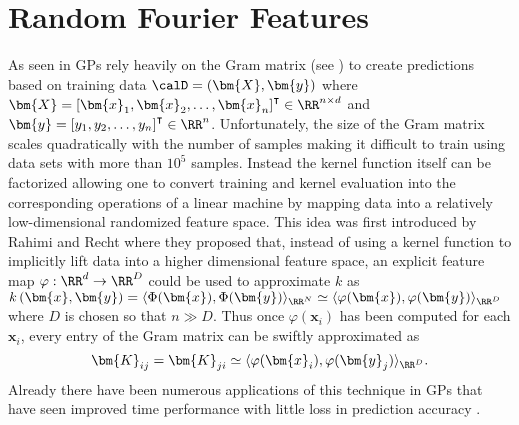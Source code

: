 \section{Random Fourier Features}\label{Chapter3}
As seen in  GPs rely heavily on the Gram matrix (see ) to create predictions based on training data $\calD = \left( \bm{X} , \bm{y} \right)$ where $\bm{X} = \left[ \bm{x}_1 , \bm{x}_2 , \ldots , \bm{x}_n \right]^{\intercal} \in \RR^{n \times d}$ and $\bm{y} = \left[ y_1 , y_2 , \ldots , y_n \right]^{\intercal} \in \RR^{n}$. Unfortunately, the size of the Gram matrix scales quadratically with the number of samples making it difficult to train using data sets with more than $10^5$ samples. Instead the kernel function itself can be factorized allowing one to convert training and kernel evaluation into the corresponding operations of a linear machine by mapping data into a relatively low-dimensional randomized feature space. This idea was first introduced by Rahimi and Recht \cite{NIPS2007_013a006f} where they proposed that, instead of using a kernel function to implicitly lift data into a higher dimensional feature space, an explicit feature map $\varphi : \RR^d \to \RR^D$ could be used to approximate $k$ as $k \left( \bm{x} , \bm{y} \right) = \langle \Phi (\bm{x}) , \Phi (\bm{y}) \rangle_{\RR^N} \simeq \langle \varphi (\bm{x}) , \varphi (\bm{y}) \rangle_{\RR^D}$ where $D$ is chosen so that $n \gg  D$. Thus once $\varphi (\bm{x}_i)$ has been computed for each $\bm{x}_i$, every entry of the Gram matrix can be swiftly approximated as
\[
    \bm{K}_{ij} = \bm{K}_{ji} \simeq \langle \varphi (\bm{x}_i) , \varphi (\bm{y}_j) \rangle_{\RR^D}.
\]
Already there have been numerous applications of this technique in GPs that have seen improved time performance with little loss in prediction accuracy \cite{PotapczynskiAndres2021BSGP}.





